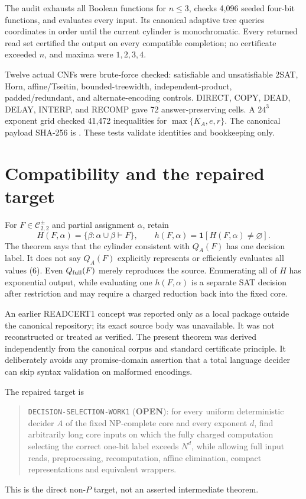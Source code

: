 \documentclass[11pt]{article}
\newcommand{\Core}{\mathcal C_{2,2}^{\pm}}
\newcommand{\OPEN}{\textbf{OPEN}}
\begin{document}
The audit exhausts all Boolean functions for \(n\le3\), checks 4,096 seeded
four-bit functions, and evaluates every input.  Its canonical adaptive tree
queries coordinates in order until the current cylinder is monochromatic.
Every returned read set certified the output on every compatible completion;
no certificate exceeded \(n\), and maxima were \(1,2,3,4\).

Twelve actual CNFs were brute-force checked: satisfiable and unsatisfiable
2SAT, Horn, affine/Tseitin, bounded-treewidth, independent-product,
padded/redundant, and alternate-encoding controls.  DIRECT, COPY, DEAD, DELAY,
INTERP, and RECOMP gave 72 answer-preserving cells.  A \(24^3\) exponent grid
checked 41,472 inequalities for \(\max\{K_A,e,r\}\).  The canonical payload
SHA-256 is
.
These tests validate identities and bookkeeping only.

\section{Compatibility and the repaired target}
For \(F\in\Core\) and partial assignment \(\alpha\), retain
\[
 H(F,\alpha)=\{\beta:\alpha\cup\beta\models F\},\qquad
 h(F,\alpha)=\mathbf 1[H(F,\alpha)\ne\varnothing].          \tag{6}
\]
The theorem says that the cylinder consistent with \(Q_A(F)\) has one decision
label.  It does not say \(Q_A(F)\) explicitly represents or efficiently
evaluates all values (6).  Even \(Q_{\rm full}(F)\) merely reproduces the
source.  Enumerating all of \(H\) has exponential output, while evaluating one
\(h(F,\alpha)\) is a separate SAT decision after restriction and may require a
charged reduction back into the fixed core.

An earlier READCERT1 concept was reported only as a local package outside the
canonical repository; its exact source body was unavailable.  It was not
reconstructed or treated as verified.  The present theorem was derived
independently from the canonical corpus and standard certificate principle.
It deliberately avoids any promise-domain assertion that a total language
decider can skip syntax validation on malformed encodings.

The repaired target is
\begin{quote}
\texttt{DECISION-SELECTION-WORK1} (\OPEN): for every uniform deterministic
decider \(A\) of the fixed NP-complete core and every exponent \(d\), find
arbitrarily long core inputs on which the fully charged computation selecting
the correct one-bit label exceeds \(N^d\), while allowing full input reads,
preprocessing, recomputation, affine elimination, compact representations and
equivalent wrappers.
\end{quote}
This is the direct non-\(P\) target, not an asserted intermediate theorem.
\end{document}
